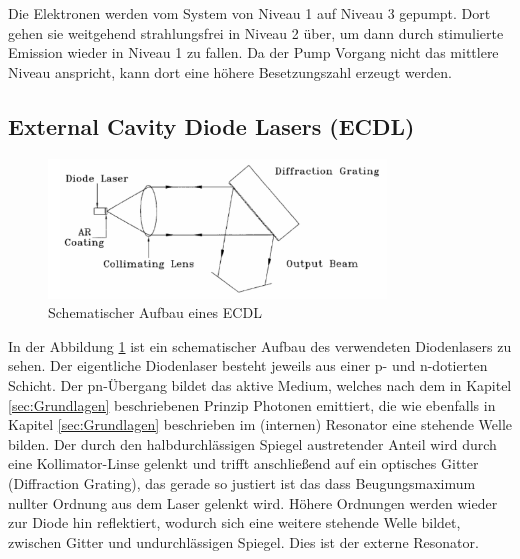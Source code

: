 Die Elektronen werden vom System von Niveau 1 auf Niveau 3 gepumpt. 
Dort gehen sie weitgehend strahlungsfrei in Niveau 2 über, 
um dann durch stimulierte Emission wieder in Niveau 1 zu fallen.
Da der Pump Vorgang nicht das mittlere Niveau anspricht,
kann dort eine höhere Besetzungszahl erzeugt werden. 


\subsection{External Cavity Diode Lasers (ECDL)}
\begin{figure}[h]
    \centering
    \includegraphics[width=0.8\textwidth]{abb/Aufbau.png}
    \caption{Schematischer Aufbau eines ECDL \cite{laser}}
    \label{fig:aufbau}
\end{figure}
In der Abbildung \ref{fig:aufbau} ist ein schematischer Aufbau des verwendeten Diodenlasers zu sehen.
Der eigentliche Diodenlaser besteht jeweils aus einer p- und n-dotierten Schicht.
Der pn-Übergang bildet das aktive Medium, 
welches nach dem in Kapitel \ref{sec:Grundlagen} beschriebenen Prinzip Photonen emittiert,
die wie ebenfalls in Kapitel \ref{sec:Grundlagen} beschrieben im (internen) Resonator eine stehende Welle bilden.
Der durch den halbdurchlässigen Spiegel austretender Anteil wird durch eine Kollimator-Linse gelenkt
und trifft anschließend auf ein optisches Gitter (Diffraction Grating),
das gerade so justiert ist 
das dass Beugungsmaximum nullter Ordnung aus dem Laser gelenkt wird.
Höhere Ordnungen werden wieder zur Diode hin reflektiert,
wodurch sich eine weitere stehende Welle bildet, 
zwischen Gitter und undurchlässigen Spiegel.
Dies ist der externe Resonator.

